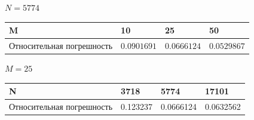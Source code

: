 \documentclass[14pt, a4paper]{extarticle}
\begin{document}
\begin{enumerate}
			\(N = 5774\)
			\begin{table}[H]
				\centering
				\begin{tabular}{|P{5cm}|P{2.5cm}|P{2.5cm}|P{2.5cm}|}
					\hline
					M & 10 & 25 & 50 \\ \hline
					Относительная погрешность & $0.0901691$ & $0.0666124$ & $0.0529867$\\ \hline
				\end{tabular}
			\end{table}
			
			\(M = 25\)
			\begin{table}[H]
				\centering
				\begin{tabular}{|P{5cm}|P{2.5cm}|P{2.5cm}|P{2.5cm}|}
					\hline
					N & 3718 & 5774 & 17101 \\ \hline
					Относительная погрешность & 0.123237 & 0.0666124 & 0.0632562\\ \hline
				\end{tabular}
			\end{table}
			

\end{enumerate}
\end{document}
